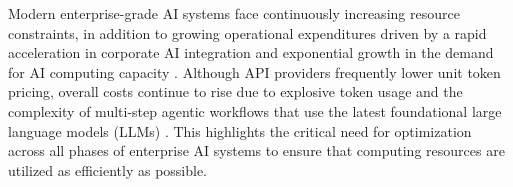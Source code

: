 %

Modern enterprise-grade AI systems face continuously increasing resource constraints, in addition to growing operational expenditures driven by a rapid acceleration in corporate AI integration and exponential growth in the demand for AI computing capacity \citep{StanfordAIIndex2026}. Although API providers frequently lower unit token pricing, overall costs continue to rise due to explosive token usage and the complexity of multi-step agentic workflows that use the latest foundational large language models (LLMs) \citep{chen2023frugalgpt, GoogleVertexAIPricing}. This highlights the critical need for optimization across all phases of enterprise AI systems to ensure that computing resources are utilized as efficiently as possible.

